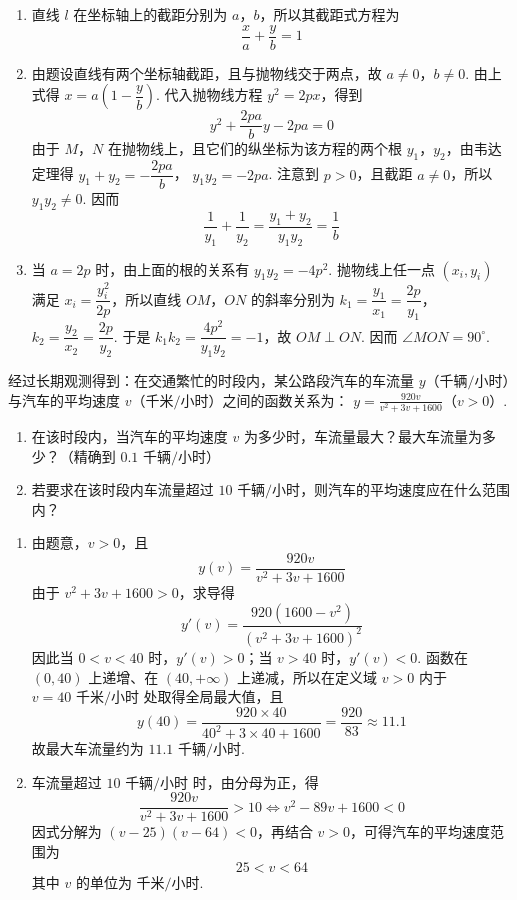 \begin{solution}
\begin{enumerate}
\item 直线 \(l\) 在坐标轴上的截距分别为 \(a\)，\(b\)，所以其截距式方程为
\[
\dfrac{x}{a}+\dfrac{y}{b}=1
\]

\item 由题设直线有两个坐标轴截距，且与抛物线交于两点，故 \(a\ne0\)，\(b\ne0\). 由上式得 \(x=a\left(1-\dfrac{y}{b}\right)\). 代入抛物线方程 \(y^2=2px\)，得到
\[
y^2+\dfrac{2pa}{b}y-2pa=0
\]
由于 \(M\)，\(N\) 在抛物线上，且它们的纵坐标为该方程的两个根 \(y_1\)，\(y_2\)，由韦达定理得
\(y_1+y_2=-\dfrac{2pa}{b}\)，
\(y_1y_2=-2pa\).
注意到 \(p>0\)，且截距 \(a\ne0\)，所以 \(y_1y_2\ne0\). 因而
\[
\dfrac1{y_1}+\dfrac1{y_2}=\dfrac{y_1+y_2}{y_1y_2}=\dfrac1b
\]

\item 当 \(a=2p\) 时，由上面的根的关系有 \(y_1y_2=-4p^2\). 抛物线上任一点 \((x_i,y_i)\) 满足 \(x_i=\dfrac{y_i^2}{2p}\)，所以直线 \(OM\)，\(ON\) 的斜率分别为
\(k_1=\dfrac{y_1}{x_1}=\dfrac{2p}{y_1}\)，
\(k_2=\dfrac{y_2}{x_2}=\dfrac{2p}{y_2}\).
于是 \(k_1k_2=\dfrac{4p^2}{y_1y_2}=-1\)，故 \(OM\perp ON\). 因而 \(\angle MON=90^\circ\).
\end{enumerate}
\end{solution}

\begin{problem}
经过长期观测得到：在交通繁忙的时段内，某公路段汽车的车流量 \(y\)（\(\text{千辆/小时}\)）与汽车的平均速度 \(v\)（\(\text{千米/小时}\)）之间的函数关系为：
\(y=\frac{920v}{v^2+3v+1600}\)（\(v>0\)）.

\begin{enumerate}
\item 在该时段内，当汽车的平均速度 \(v\) 为多少时，车流量最大？最大车流量为多少？（精确到 \(0.1\text{ 千辆/小时}\)）
\item 若要求在该时段内车流量超过 \(10\text{ 千辆/小时}\)，则汽车的平均速度应在什么范围内？
\end{enumerate}
\end{problem}

\begin{solution}
\begin{enumerate}
\item 由题意，\(v>0\)，且
\[
y(v)=\dfrac{920v}{v^2+3v+1600}
\]
由于 \(v^2+3v+1600>0\)，求导得
\[
y'(v)=\dfrac{920(1600-v^2)}{(v^2+3v+1600)^2}
\]
因此当 \(0<v<40\) 时，\(y'(v)>0\)；当 \(v>40\) 时，\(y'(v)<0\). 函数在 \((0,40)\) 上递增、在 \((40,+\infty)\) 上递减，所以在定义域 \(v>0\) 内于 \(v=40\text{ 千米/小时}\) 处取得全局最大值，且
\[
y(40)=\dfrac{920\times40}{40^2+3\times40+1600}=\dfrac{920}{83}\approx11.1
\]
故最大车流量约为 \(11.1\text{ 千辆/小时}\).

\item 车流量超过 \(10\text{ 千辆/小时}\) 时，由分母为正，得
\[
\dfrac{920v}{v^2+3v+1600}>10
\Longleftrightarrow v^2-89v+1600<0
\]
因式分解为 \((v-25)(v-64)<0\)，再结合 \(v>0\)，可得汽车的平均速度范围为
\[
25<v<64
\]
其中 \(v\) 的单位为 \(\text{千米/小时}\).
\end{enumerate}
\end{solution}

